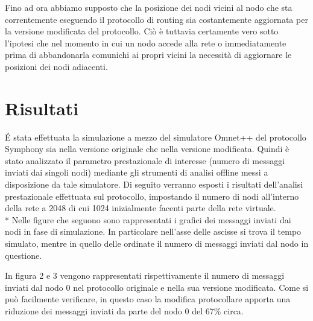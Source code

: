 \documentclass[	
	DIV=calc,
	paper=a4,
	fontsize=11pt,
	onecolumn
]{scrartcl} %
\begin{document}
Fino ad ora abbiamo supposto che la posizione dei nodi vicini al nodo che sta correntemente eseguendo il protocollo di routing sia costantemente aggiornata per la versione modificata del protocollo. Ciò è tuttavia certamente vero sotto l'ipotesi che nel momento in cui un nodo accede alla rete o immediatamente prima di abbandonarla comunichi ai propri vicini la necessità di aggiornare le posizioni dei nodi adiacenti.
\section{Risultati}
\'E stata effettuata la simulazione a mezzo del simulatore Omnet++ del protocollo Symphony sia nella versione originale che nella versione modificata. Quindi è stato analizzato il parametro prestazionale di interesse (numero di messaggi inviati dai singoli nodi) mediante gli strumenti di analisi offline messi a disposizione da tale simulatore. Di seguito verranno esposti i risultati dell'analisi prestazionale effettuata sul protocollo, impostando il numero di nodi all'interno della rete a 2048 di cui 1024 inizialmente facenti parte della rete virtuale.
\\*
Nelle figure che seguono sono rappresentati i grafici dei messaggi inviati dai nodi in fase di simulazione. In particolare nell'asse delle ascisse si trova il tempo simulato, mentre in quello delle ordinate il numero di messaggi inviati dal nodo in questione.

In figura 2 e 3 vengono rappresentati rispettivamente il numero di messaggi inviati dal nodo 0 nel protocollo originale e nella sua versione modificata. Come si può facilmente verificare, in questo caso la modifica protocollare apporta una riduzione dei messaggi inviati da parte del nodo 0 del 67\% circa. 
\end{document}
